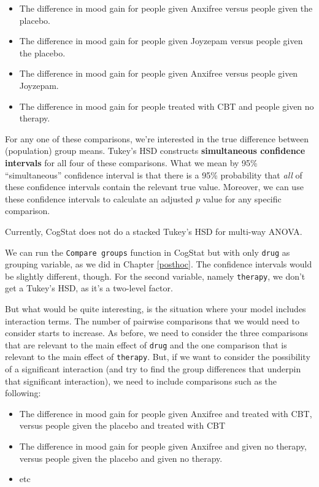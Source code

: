 \documentclass[
]{book}
\providecommand{\tightlist}{%
  \setlength{\itemsep}{0pt}\setlength{\parskip}{0pt}}
\theoremstyle{definition}
\theoremstyle{definition}
\theoremstyle{definition}
\theoremstyle{definition}
\theoremstyle{remark}
\begin{document}
\begin{itemize}
\tightlist
\item
  The difference in mood gain for people given Anxifree versus people given the placebo.
\item
  The difference in mood gain for people given Joyzepam versus people given the placebo.
\item
  The difference in mood gain for people given Anxifree versus people given Joyzepam.
\item
  The difference in mood gain for people treated with CBT and people given no therapy.
\end{itemize}

For any one of these comparisons, we're interested in the true difference between (population) group means. Tukey's HSD constructs \textbf{simultaneous confidence intervals} for all four of these comparisons. What we mean by 95\% ``simultaneous'' confidence interval is that there is a 95\% probability that \emph{all} of these confidence intervals contain the relevant true value. Moreover, we can use these confidence intervals to calculate an adjusted \(p\) value for any specific comparison.

Currently, CogStat does not do a stacked Tukey's HSD for multi-way ANOVA.

We can run the \texttt{Compare\ groups} function in CogStat but with only \texttt{drug} as grouping variable, as we did in Chapter \ref{posthoc}. The confidence intervals would be slightly different, though. For the second variable, namely \texttt{therapy}, we don't get a Tukey's HSD, as it's a two-level factor.

But what would be quite interesting, is the situation where your model includes interaction terms. The number of pairwise comparisons that we would need to consider starts to increase. As before, we need to consider the three comparisons that are relevant to the main effect of \texttt{drug} and the one comparison that is relevant to the main effect of \texttt{therapy}. But, if we want to consider the possibility of a significant interaction (and try to find the group differences that underpin that significant interaction), we need to include comparisons such as the following:

\begin{itemize}
\tightlist
\item
  The difference in mood gain for people given Anxifree and treated with CBT, versus people given the placebo and treated with CBT
\item
  The difference in mood gain for people given Anxifree and given no therapy, versus people given the placebo and given no therapy.
\item
  etc
\end{itemize}
\end{document}
